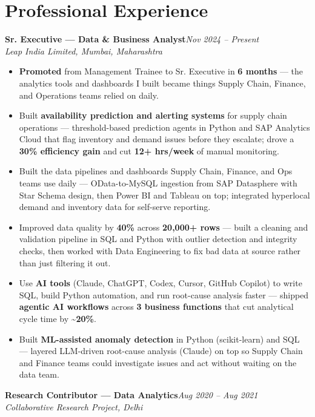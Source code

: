 \documentclass[10pt, letterpaper]{article}
\newcommand{\role}[3]{%
  \vspace{2pt}%
  {\bfseries #1}\hfill{\small\color{muted}\textit{#3}}\\[-2pt]%
  {\small\color{muted}\textit{#2}}%
}
\begin{document}
\section{Professional Experience}

\role{Sr. Executive --- Data \& Business Analyst}{Leap India Limited, Mumbai, Maharashtra}{Nov 2024 -- Present}

\begin{itemize}
  \item \textbf{Promoted} from Management Trainee to Sr. Executive in \textbf{6 months} --- the analytics tools and dashboards I built became things Supply Chain, Finance, and Operations teams relied on daily.
  \item Built \textbf{availability prediction and alerting systems} for supply chain operations --- threshold-based prediction agents in Python and SAP Analytics Cloud that flag inventory and demand issues before they escalate; drove a \textbf{30\% efficiency gain} and cut \textbf{12+ hrs/week} of manual monitoring.
  \item Built the data pipelines and dashboards Supply Chain, Finance, and Ops teams use daily --- OData-to-MySQL ingestion from SAP Datasphere with Star Schema design, then Power BI and Tableau on top; integrated hyperlocal demand and inventory data for self-serve reporting.
  \item Improved data quality by \textbf{40\%} across \textbf{20,000+ rows} --- built a cleaning and validation pipeline in SQL and Python with outlier detection and integrity checks, then worked with Data Engineering to fix bad data at source rather than just filtering it out.
  \item Use \textbf{AI tools} (Claude, ChatGPT, Codex, Cursor, GitHub Copilot) to write SQL, build Python automation, and run root-cause analysis faster --- shipped \textbf{agentic AI workflows} across \textbf{3 business functions} that cut analytical cycle time by \textbf{\textasciitilde20\%}.
  \item Built \textbf{ML-assisted anomaly detection} in Python (scikit-learn) and SQL --- layered LLM-driven root-cause analysis (Claude) on top so Supply Chain and Finance teams could investigate issues and act without waiting on the data team.
\end{itemize}

\vspace{1pt}

\role{Research Contributor --- Data Analytics}{Collaborative Research Project, Delhi}{Aug 2020 -- Aug 2021}
\end{document}
